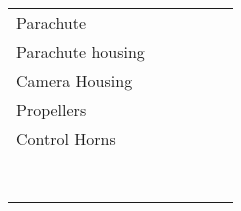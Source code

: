 \documentclass[]{auvsi_doc}
\begin{document}
\begin{table}[h!]
\begin{center}
\begin{tabularx}{\textwidth}{l l l l l l}
			Parachute  &   &   &   &   &   \\
			Parachute housing  &   &   &   &   &   \\
			Camera Housing  &   &   &   &   &   \\
			Propellers  &   &   &   &   &   \\
			Control Horns  &   &   &   &   &   \\ 
			  &   &   &   &   &   \\
			  &   &   &   &   &   \\
			  &   &   &   &   &   \\
			  &   &   &   &   &   \\
			  &   &   &   &   &   \\
			  &   &   &   &   &   \\ 
			  &   &   &   &   &   \\
			  &   &   &   &   &   \\
			\bottomrule
		\end{tabularx}
	\end{center}
\end{table}
\end{document}
